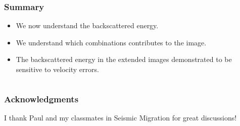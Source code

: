 \begin{frame} \frametitle{Summary}
\begin{itemize}
    \item We now understand the backscattered energy.
    \item We understand which combinations contributes to the image.
    \item The backscattered energy  in the extended images demonstrated to be sensitive to velocity
    errors.
\end{itemize}
\end{frame}



 \begin{frame} 
 \begin{columns} 
   \end{columns}
\end{frame}


\begin{frame} \frametitle{Acknowledgments}
I thank Paul and my classmates in Seismic Migration for great discussions!
\end{frame}





